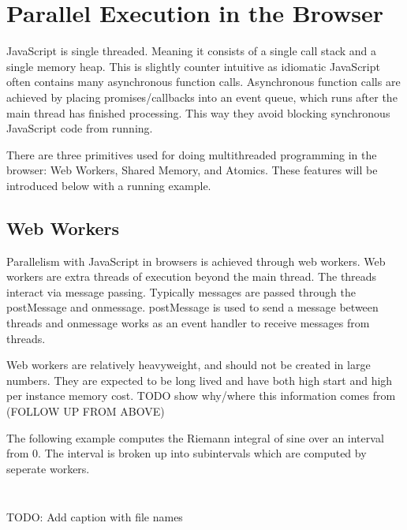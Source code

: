 \documentclass[11pt]{article}
\begin{document}
\newpage





\section{Parallel Execution in the Browser}



JavaScript is single threaded. Meaning it consists of a single call stack and a single memory heap. This is slightly counter intuitive as idiomatic JavaScript often contains many asynchronous function calls. Asynchronous function calls are achieved by placing promises/callbacks into an event queue, which runs after the main thread has finished processing. This way they avoid blocking synchronous JavaScript code from running. 

There are three primitives used for doing multithreaded programming in the browser: Web Workers, Shared Memory, and Atomics. These features will be introduced below with a running example. 


\subsection{Web Workers}
Parallelism with JavaScript in browsers is achieved through web workers. Web workers are extra threads of execution beyond the main thread. The threads interact via message passing. Typically messages are passed through the postMessage and onmessage. postMessage is used to send a message between threads and onmessage works as an event handler to receive messages from threads. 


Web workers are relatively heavyweight, and should not be created in large numbers. They are expected to be long lived and have both high start and high per instance memory cost. 
TODO show why/where this information comes from (FOLLOW UP FROM ABOVE)

The following example computes the Riemann integral of sine over an interval from 0. The interval is broken up into subintervals which are computed by seperate workers.


\inputminted[fontsize=\small,baselinestretch=0.5,linenos]{html}{code/worker/integrate.html}

\inputminted[fontsize=\small,baselinestretch=0.5,linenos]{javascript}{code/worker/worker.js}

TODO: Add caption with file names
\end{document}
